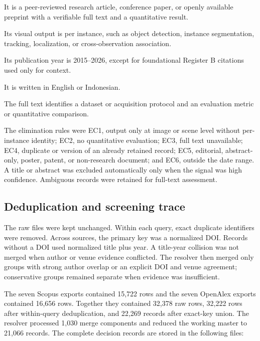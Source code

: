 \begin{description}[leftmargin=*,style=nextline,itemsep=2pt]
  \item[IC1.] It is a peer-reviewed research article, conference paper, or openly available preprint with a verifiable full text and a quantitative result.
  \item[IC2.] Its visual output is per instance, such as object detection, instance segmentation, tracking, localization, or cross-observation association.
  \item[IC3.] Its publication year is 2015--2026, except for foundational Register B citations used only for context.
  \item[IC4.] It is written in English or Indonesian.
  \item[IC5.] The full text identifies a dataset or acquisition protocol and an evaluation metric or quantitative comparison.
\end{description}

The elimination rules were EC1, output only at image or scene level without per-instance identity; EC2, no quantitative evaluation; EC3, full text unavailable; EC4, duplicate or version of an already retained record; EC5, editorial, abstract-only, poster, patent, or non-research document; and EC6, outside the date range. A title or abstract was excluded automatically only when the signal was high confidence. Ambiguous records were retained for full-text assessment.

\subsection{Deduplication and screening trace}

The raw files were kept unchanged. Within each query, exact duplicate identifiers were removed. Across sources, the primary key was a normalized DOI. Records without a DOI used normalized title plus year. A title-year collision was not merged when author or venue evidence conflicted. The resolver then merged only groups with strong author overlap or an explicit DOI and venue agreement; conservative groups remained separate when evidence was insufficient.

The seven Scopus exports contained 15,722 rows and the seven OpenAlex exports contained 16,656 rows. Together they contained 32,378 raw rows, 32,222 rows after within-query deduplication, and 22,269 records after exact-key union. The resolver processed 1,030 merge components and reduced the working master to 21,066 records. The complete decision records are stored in the following files:
\begin{quote}
\par
{}
\end{quote}

